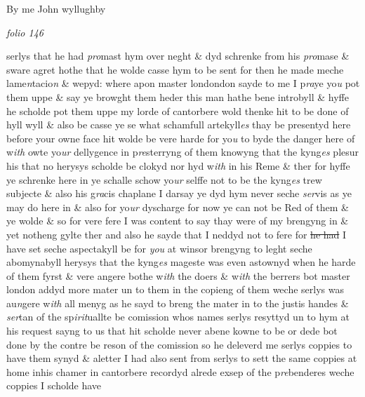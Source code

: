 \documentclass[12pt, a4paper]{book}
\begin{document}
		\ifthenelse{\isodd{\thepage}}
		{\reversemarginpar}
		{\normalmarginpar}
		By me John wyllughby

\dotfill
						\newpage
{}

\textit{folio 146}



		\ifthenelse{\isodd{\thepage}}
		{\reversemarginpar}
		{\normalmarginpar}
		serlys that he had \textit{pro}mast hym over neght \& dyd schrenke from
 his \textit{pro}mase \& sware agret hothe that he wolde casse hym to be
 sent for then he made meche lame\textit{n}tacio\textit{n} \& wepyd: where apon
	master londondon sayde to me I p\textit{ra}ye yo\textit{u} pot them uppe \& say
 ye browght them heder this man hathe bene introbyll
 \& hyffe he scholde pot them uppe my lorde of cantorbere wold
 thenke hit to be done of hyll wyll \& also be casse ye se what
 schamfull artekyll\textit{es} thay be
			 presentyd here before your owne face
 hit wolde be vere harde for yo\textit{u} to byde the danger here of w\textit{ith}
 owte yo\textit{ur} dellygence in p\textit{re}sterryng of them knowyng that the
 kyng\textit{es }plesur his that no herysys scholde be clokyd nor hyd w\textit{ith} in
 his Reme \& ther for hyffe ye schrenke here in ye schalle schow
 yo\textit{ur} selffe not to be the kyng\textit{es} trew subjecte \& also his g\textit{ra}cis
 chaplane I darsay ye dyd hym never seche \textit{ser}vis as ye may
 do here in \& also for yo\textit{ur} dyscharge for now ye can not be Red
 of them \& ye wolde \& so for vere fere I was content to say
 thay were of my brengyng in \& yet notheng gylte ther
 and also he sayde that I neddyd not to fere for \sout{he had} I have
			 set seche
 aspectakyll be for \textit{you} at winsor brengyng to leght seche
 abomynabyll herysys that the kyng\textit{es} mageste was even
 astownyd when he harde of them fyrst \& vere angere bothe
 w\textit{ith} the doers \& w\textit{ith} the berrers bot master london addyd more
 mater un to them in the copieng of them weche serlys
 was au\textit{n}gere w\textit{ith} all menyg as he sayd to breng the
 mater in to the justis handes \& \textit{ser}tan of the sp\textit{irit}uallte
 be comission whos names serlys resyttyd un to hym at
 his request sayng to us that hit scholde never abene
 kowne to be or dede bot done by the contre be reson of
 the comission so he deleverd me serlys coppies to have them
 synyd \& aletter I had also sent from serlys to sett the
	same coppies at home inhis chamer in cantorbere recordyd
 alrede exsep of the p\textit{re}benderes weche coppies I scholde have
 	
\end{document}
